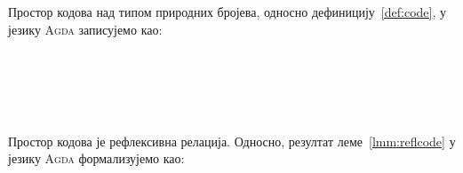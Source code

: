 Простор кодова над типом природних бројева, односно дефиницију~\ref{def:code}, у језику \textsc{Agda} записујемо као:
\begin{code}%
\>[0]\AgdaSpace{}%
\AgdaSymbol{:}\AgdaSpace{}%
\AgdaSpace{}%
\AgdaSpace{}%
\AgdaSpace{}%
\AgdaSpace{}%
\AgdaSpace{}%
\<%
\\
\>[0]\AgdaSpace{}%
\AgdaSpace{}%
\AgdaSpace{}%
\AgdaSymbol{=}\AgdaSpace{}%
\<%
\\
\>[0]\AgdaSpace{}%
\AgdaSpace{}%
\AgdaSymbol{(}\AgdaSpace{}%
\AgdaSymbol{)}\AgdaSpace{}%
\AgdaSymbol{=}\AgdaSpace{}%
\<%
\\
\>[0]\AgdaSpace{}%
\AgdaSymbol{(}\AgdaSpace{}%
\AgdaSymbol{)}\AgdaSpace{}%
\AgdaSpace{}%
\AgdaSymbol{=}\AgdaSpace{}%
\<%
\\
\>[0]\AgdaSpace{}%
\AgdaSymbol{(}\AgdaSpace{}%
\AgdaSymbol{)}\AgdaSpace{}%
\AgdaSymbol{(}\AgdaSpace{}%
\AgdaSymbol{)}\AgdaSpace{}%
\AgdaSymbol{=}\AgdaSpace{}%
\AgdaSpace{}%
\AgdaSpace{}%
\<%
\end{code}

Простор кодова је рефлексивна релација. Односно, резултат леме~\ref{lmm:reflcode} у језику \textsc{Agda} формализујемо као:
\begin{code}%
\>[0]\AgdaSpace{}%
\AgdaSymbol{:}\AgdaSpace{}%
\AgdaSymbol{(}\AgdaSpace{}%
\AgdaSymbol{:}\AgdaSpace{}%
\AgdaSymbol{)}\AgdaSpace{}%
\AgdaSpace{}%
\AgdaSpace{}%
\AgdaSpace{}%
\<%
\\
\>[0]\AgdaSpace{}%
%
\>[21]\AgdaSymbol{=}\AgdaSpace{}%
\<%
\\
\>[0]\AgdaSpace{}%
\AgdaSymbol{(}\AgdaSpace{}%
\AgdaSymbol{)}\AgdaSpace{}%
\AgdaSymbol{=}\AgdaSpace{}%
\AgdaSpace{}%
\<%
\end{code}

